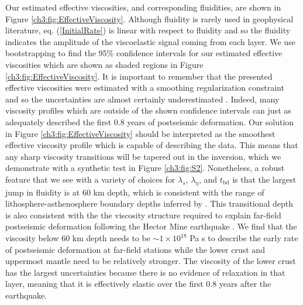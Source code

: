 Our estimated effective viscosities, and corresponding fluidities, are
shown in Figure \ref{ch3:fig:EffectiveViscosity}.  Although fluidity
is rarely used in geophysical literature, eq. (\ref{InitialRate}) is
linear with respect to fluidity and so the fluidity indicates the
amplitude of the viscoelastic signal coming from each layer.  We use
bootstrapping to find the 95\% confidence intervals for our estimated
effective viscosities which are shown as shaded regions in Figure
\ref{ch3:fig:EffectiveViscosity}.  It is important to remember that
the presented effective viscosities were estimated with a smoothing
regularization constraint and so the uncertainties are almost
certainly underestimated \citep{Aster2011}.  Indeed, many viscosity
profiles which are outside of the shown confidence intervals can just
as adequately described the first 0.8 years of postseismic
deformation. Our solution in Figure \ref{ch3:fig:EffectiveViscosity}
should be interpreted as the smoothest effective viscosity profile
which is capable of describing the data.  This means that any sharp
viscosity transitions will be tapered out in the inversion, which we
demonstrate with a synthetic test in Figure \ref{ch3:fig:S2}.  Nonetheless, a robust
feature that we see with a variety of choices for $\lambda_s$,
$\lambda_\eta$, and $t_\mathrm{bd}$ is that the largest jump in
fluidity is at 60 km depth, which is consistent with the range of
lithosphere-asthenosphere boundary depths inferred by
\citet{Lekic2011}. This transitional depth is also consistent with the
the viscosity structure required to explain far-field postseismic
deformation following the Hector Mine earthquake \citep{Freed2007a}.
We find that the viscosity below 60 km depth needs to be
${\sim}1\times10^{18}$ Pa s to describe the early rate of postseismic
deformation at far-field stations while the lower crust and uppermost
mantle need to be relatively stronger.  The viscosity of the lower
crust has the largest uncertainties because there is no evidence of
relaxation in that layer, meaning that it is effectively elastic over
the first 0.8 years after the earthquake.

